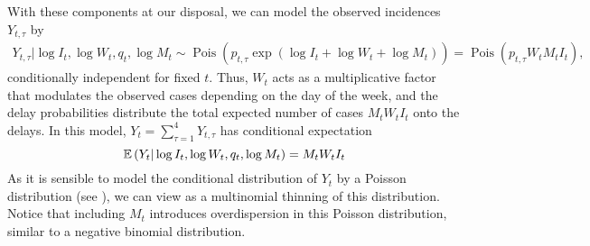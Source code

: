 With these components at our disposal, we can model the observed incidences $Y_{t, \tau}$ by
\begin{align}
    \label{eq:reporting_delays_Y}
    Y_{t, \tau} | \log I_{t}, \log W_{t}, q_{t}, \log M_{t} \sim \operatorname{Pois} \left( p_{t, \tau}\exp \left(\log I_{t} + \log W_{t}  + \log M_{t}\right) \right) = \operatorname{Pois} \left( p_{t, \tau} W_{t} M_{t} I_{t}\right),
\end{align}
conditionally independent for fixed $t$. Thus, $W_{t}$ acts as a multiplicative factor that modulates the observed cases depending on the day of the week, and the delay probabilities distribute the total expected number of cases $M_{t}W_{t}I_{t}$ onto the delays. In this model, $Y_{t} = \sum_{\tau = 1}^4 Y_{t, \tau}$ has conditional expectation 
$$
    \mathbb E \left( Y_{t} | \log I_{t}, \log W_{t}, q_{t}, \log M_{t} \right) = M_{t}W_{t}I_t
$$
As it is sensible to model the conditional distribution of $Y_{t}$ by a Poisson distribution (see ), we can view  as a multinomial thinning of this distribution. Notice that including $M_{t}$ introduces overdispersion in this Poisson distribution, similar to a negative binomial distribution. 

